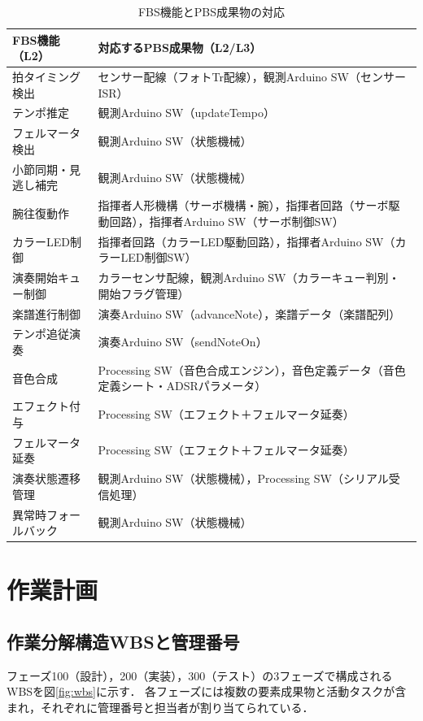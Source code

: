 \begin{table}[H]
  \centering
  \caption{FBS機能とPBS成果物の対応}
  \label{tab:fbs-pbs}
  \begin{tabularx}{\linewidth}{lX}
    \toprule
    FBS機能（L2） & 対応するPBS成果物（L2/L3） \\
    \midrule
    拍タイミング検出    & センサー配線（フォトTr配線），観測Arduino SW（センサーISR） \\
    テンポ推定          & 観測Arduino SW（updateTempo） \\
    フェルマータ検出    & 観測Arduino SW（状態機械） \\
    小節同期・見逃し補完 & 観測Arduino SW（状態機械） \\
    \midrule
    腕往復動作          & 指揮者人形機構（サーボ機構・腕），指揮者回路（サーボ駆動回路），指揮者Arduino SW（サーボ制御SW） \\
    カラーLED制御 & 指揮者回路（カラーLED駆動回路），指揮者Arduino SW（カラーLED制御SW） \\
    \midrule
    演奏開始キュー制御  & カラーセンサ配線，観測Arduino SW（カラーキュー判別・開始フラグ管理） \\
    楽譜進行制御        & 演奏Arduino SW（advanceNote），楽譜データ（楽譜配列） \\
    テンポ追従演奏      & 演奏Arduino SW（sendNoteOn） \\
    \midrule
    音色合成            & Processing SW（音色合成エンジン），音色定義データ（音色定義シート・ADSRパラメータ） \\
    エフェクト付与      & Processing SW（エフェクト＋フェルマータ延奏） \\
    フェルマータ延奏    & Processing SW（エフェクト＋フェルマータ延奏） \\
    \midrule
    演奏状態遷移管理    & 観測Arduino SW（状態機械），Processing SW（シリアル受信処理） \\
    異常時フォールバック & 観測Arduino SW（状態機械） \\
    \bottomrule
  \end{tabularx}
\end{table}

\section{作業計画}

\subsection{作業分解構造WBSと管理番号}
フェーズ100（設計），200（実装），300（テスト）の3フェーズで構成されるWBSを図\ref{fig:wbs}に示す．
各フェーズには複数の要素成果物と活動タスクが含まれ，それぞれに管理番号と担当者が割り当てられている．

